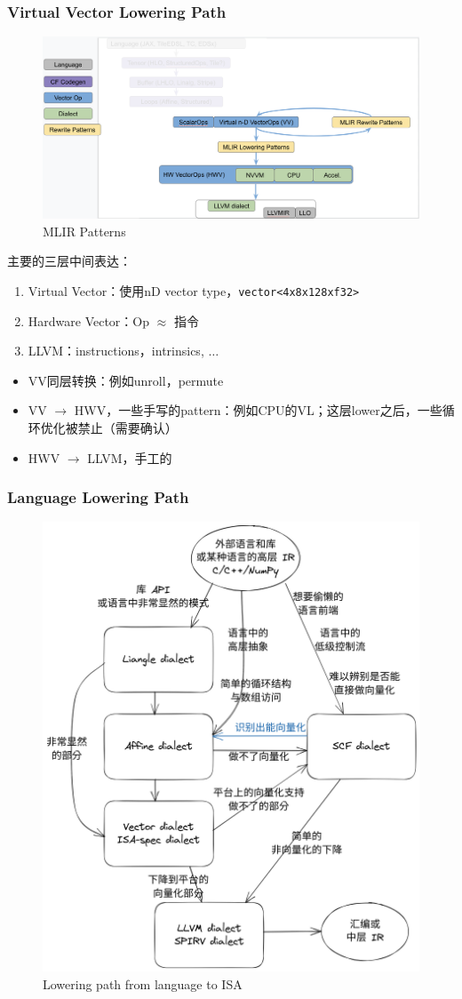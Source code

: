 \documentclass[aspectratio=169]{ctexbeamer}
\begin{document}
\begin{frame}
    \frametitle{Virtual Vector Lowering Path}
    \noindent
    \begin{minipage}[t]{0.50\linewidth}
        \begin{figure}
            \centering
            \includegraphics[width=1.0\linewidth]{images/position2.png}
            \caption{MLIR Patterns}
        \end{figure}
    \end{minipage}%
    \hfill%
    \begin{minipage}[t]{0.45\linewidth}
        主要的三层中间表达：
        \begin{enumerate}
            \item Virtual Vector：使用nD vector type，\texttt{vector<4x8x128xf32>}
            \item Hardware Vector：Op $\approx$ 指令
            \item LLVM：instructions，intrinsics, $\dots$
        \end{enumerate}

        \begin{itemize}
            \item VV同层转换：例如unroll，permute
            \item VV $\rightarrow$ HWV，一些手写的pattern：例如CPU的VL；这层lower之后，一些循环优化被禁止（需要确认）
            \item HWV $\rightarrow$ LLVM，手工的
        \end{itemize}
    \end{minipage}
\end{frame}

\begin{frame}
    \frametitle{Language Lowering Path}
    \begin{figure}
        \centering
        \includegraphics[width=0.35\linewidth]{images/auto-vec-path.png}
        \caption{Lowering path from language to ISA}
    \end{figure}
\end{frame}
\end{document}
